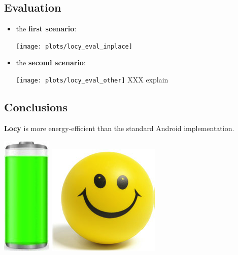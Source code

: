 \documentclass[a2,landscape]{a0poster}
\begin{document}
\mbox{}\framebreak
\begin{center}
\section*{Evaluation}
\end{center}
\begin{itemize}
   \item the \textbf{first scenario}:
   
\texttt{[image: plots/locy\_eval\_inplace]}


   \item the \textbf{second scenario}:
   
\texttt{[image: plots/locy\_eval\_other]}
XXX explain 

  \end{itemize}

\begin{center}
\section*{Conclusions}
\end{center}

\textbf{Locy} is more energy-efficient than the standard Android implementation. 
\begin{center}
\includegraphics[scale=0.7]{plots/full_battery}
\includegraphics[scale=0.7]{plots/happy_face}
\end{center}
\end{document}
